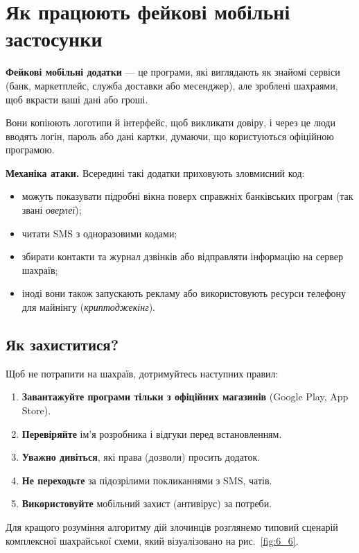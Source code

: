 \section{Як працюють фейкові мобільні застосунки}

\textbf{Фейкові мобільні додатки} — це програми, які виглядають як знайомі сервіси (банк, маркетплейс, служба доставки або месенджер), але зроблені шахраями, щоб вкрасти ваші дані або гроші.

Вони копіюють логотипи й інтерфейс, щоб викликати довіру, і через це люди вводять логін, пароль або дані картки, думаючи, що користуються офіційною програмою.

\textbf{Механіка атаки.}
Всередині такі додатки приховують зловмисний код:
\begin{itemize}
    \item можуть показувати підробні вікна поверх справжніх банківських програм (так звані \textit{оверлеї});
    \item читати SMS з одноразовими кодами;
    \item збирати контакти та журнал дзвінків або відправляти інформацію на сервер шахраїв;
    \item іноді вони також запускають рекламу або використовують ресурси телефону для майнінгу (\textit{криптоджекінг}).
\end{itemize}

\subsection*{Як захиститися?}

Щоб не потрапити на шахраїв, дотримуйтесь наступних правил:
\begin{enumerate}
    \item \textbf{Завантажуйте програми тільки з офіційних магазинів} (Google Play, App Store).
    \item \textbf{Перевіряйте} ім’я розробника і відгуки перед встановленням.
    \item \textbf{Уважно дивіться}, які права (дозволи) просить додаток.
    \item \textbf{Не переходьте} за підозрілими покликаннями з SMS, чатів.
    \item \textbf{Використовуйте} мобільний захист (антивірус) за потреби.
\end{enumerate}

Для кращого розуміння алгоритму дій злочинців розглянемо типовий сценарій комплексної шахрайської схеми, який візуалізовано на рис.~\ref{fig:6_6}.

